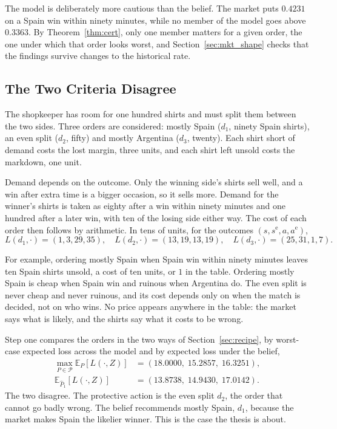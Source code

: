 The model is deliberately more cautious than the belief. The market puts
$0.4231$ on a Spain win within ninety minutes, while no member of the model
goes above $0.3363$. By Theorem~\ref{thm:cert}, only one member matters for a
given order, the one under which that order looks worst, and
Section~\ref{sec:mkt_shape} checks that the findings survive changes to the
historical rate.

\subsection{The Two Criteria Disagree}\label{sec:mkt_decision}

The shopkeeper has room for one hundred shirts and must split them between the
two sides. Three orders are considered: mostly Spain ($d_1$, ninety Spain
shirts), an even split ($d_2$, fifty) and mostly Argentina ($d_3$, twenty).
Each shirt short of demand costs the lost margin, three units, and each shirt
left unsold costs the markdown, one unit.

Demand depends on the outcome. Only the winning side's shirts sell well, and a
win after extra time is a bigger occasion, so it sells more. Demand for the
winner's shirts is taken as eighty after a win within ninety minutes and one
hundred after a later win, with ten of the losing side either way. The cost of
each order then follows by arithmetic. In tens of units, for the outcomes
$(s,s^{\mathrm e},a,a^{\mathrm e})$,
\[
 L(d_1,\cdot)=(1,3,29,35),\quad
 L(d_2,\cdot)=(13,19,13,19),\quad
 L(d_3,\cdot)=(25,31,1,7).
\]

For example, ordering mostly Spain when Spain win within ninety minutes leaves
ten Spain shirts unsold, a cost of ten units, or $1$ in the table. Ordering
mostly Spain is cheap when Spain win and ruinous when Argentina do. The even
split is never cheap and never ruinous, and its cost depends only on when the
match is decided, not on who wins. No price appears anywhere in the table: the
market says what is likely, and the shirts say what it costs to be wrong.

Step one compares the orders in the two ways of Section~\ref{sec:recipe}, by
worst-case expected loss across the model and by expected loss under the
belief,
\[
\begin{aligned}
  \max_{P\in\mathcal P}\mathbb E_{P}[L(\cdot,Z)]&=(18.0000,\;15.2857,\;16.3251),\\
  \mathbb E_{\widehat P_1}[L(\cdot,Z)]&=(13.8738,\;14.9430,\;17.0142).
\end{aligned}
\]
The two disagree. The protective action is the even split $d_2$, the order
that cannot go badly wrong. The belief recommends mostly Spain, $d_1$, because
the market makes Spain the likelier winner. This is the case the thesis is
about.

